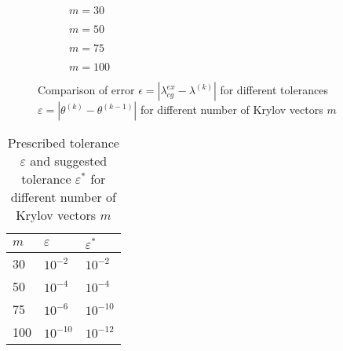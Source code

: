\documentclass[11pt,a4paper]{article}
\begin{document}
\begin{figure}[h!]
	\centering
	\begin{subfigure}[h!]{0.5\textwidth}
		\begin{center}
			\resizebox{0.37\width}{!}{}
			\caption{$m=30$}
			\label{fig::m30}
		\end{center}	
	\end{subfigure}
	\begin{subfigure}[h!]{0.49\textwidth}
		\resizebox{0.37\width}{!}{}
		\caption{$m=50$}
		\label{fig::m50}
	\end{subfigure}
	\begin{subfigure}[h!]{0.5\textwidth}
		\begin{center}
			\resizebox{0.37\width}{!}{}
			\caption{$m=75$}
			\label{fig::m75}
		\end{center}	
	\end{subfigure}
	\begin{subfigure}[h!]{0.49\textwidth}
		\resizebox{0.37\width}{!}{}
		\caption{$m=100$}
		\label{fig::m100}
	\end{subfigure}
	\caption{\label{fig::mLanc} Comparison of error $\epsilon = |\lambda_{cg}^{ex} - \lambda^{(k)}|$ for different tolerances $\varepsilon = |\theta^{(k)} - \theta^{(k-1)}|$ for different number of Krylov vectors $m$}
\end{figure}

\renewcommand{\arraystretch}{2}
\begin{table}[h!]
	\begin{center}
		\begin{tabular}{ p{2cm} p{2cm} p{2cm}}
			\hline
			\hline
			$m$ & $\varepsilon$ & $\varepsilon^*$ \\
			\hline
			\hline
			30 &  $10^{-2}$ & $10^{-2}$\\
			\hline
			50 & $10^{-4}$ & $10^{-4}$\\
			\hline
			75 & $10^{-6}$ & $10^{-10}$\\
			\hline
			100 & $10^{-10}$ & $10^{-12}$\\
			\hline
			\hline
		\end{tabular}
		\caption{\label{tab:Tol}  Prescribed tolerance $\varepsilon$ and suggested tolerance $\varepsilon^*$ for different number of Krylov vectors $m$}
	\end{center}
\end{table}
\renewcommand{\arraystretch}{1}
\end{document}
